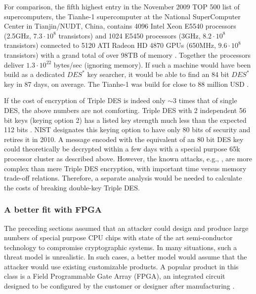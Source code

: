 \documentclass{article}
\begin{document}
\begin{comment}
84 bit
 120*84*2^(84-1)/(2.15*10^9*8.5*10^8*2^(16)*60*60*24)
96 bit
 120*96*2^(96-1)/(2.15*10^9*8.5*10^8*2^(16)*60*60*24*365)
\end{comment}

For comparison, the fifth highest entry in the November 2009 TOP 500 list of supercomputers,
the Tianhe-1 supercomputer at the National SuperComputer 
Center in Tianjin/NUDT, China, contains 4096 Intel Xeon E5540 processors (2.5GHz, 
$7.3\cdot 10^8$ transistors) and 1024 E5450 processors (3GHz, $8.2\cdot 10^8$ transistors) 
connected to 5120 ATI Radeon HD 4870 GPUs (650MHz, $9.6\cdot 10^8$ transistors)
with a grand total of over 98TB of memory \cite{StromGPU2009,Tianhe1,Valich2009}.
Together the processors deliver $1.3\cdot 10^{22}$ bytes/sec (ignoring memory). If such a machine 
would have been build as a dedicated $DES^*$  key searcher, it would be able to find an 
84 bit $DES^*$  key in 87 days, on average. The Tianhe-1 was build for close to
88 million USD \cite{Valich2009}.

\begin{comment}
Tianhe-1 84 bits
120*84*2^(84-1)/(1.3*10^(22)*60*60*24)
\end{comment}

If the cost of encryption of Triple DES is indeed only $\sim$3 times that of single DES, the above 
numbers are not comforting. Triple DES with 2 independent 56 bit keys (keying option 2) has a listed
key strength much less than the expected 112 bits \cite{lucks1998attacking,OorschotWiener90known}. 
NIST designates this keying option to have only 80 bits of security \cite{Polketal2006} and retires it
in 2010. A message  encoded with the equivalent of an 80 bit  DES key could theoretically be decrypted within a 
few days with a special purpose 65k processor cluster as described above. However, the known 
attacks, e.g., \cite{OorschotWiener90known,lucks1998attacking}, are more complex than mere 
Triple DES encryption, with important time versus memory trade-off relations. 
Therefore, a separate analysis would be needed to calculate the costs of breaking double-key Triple DES.

\subsubsection{A better fit with FPGA}\label{SectFPGA}

The preceding sections assumed that an attacker could design and produce large numbers
of special purpose CPU chips with state of the art semi-conductor technology to compromise 
cryptographic systems. In many situations, such a threat model is unrealistic. In such cases, 
a better model would assume that the attacker would use existing customizable products.
A popular product in this class is a Field Programmable Gate Array (FPGA), an integrated circuit designed to be configured by the customer or designer after manufacturing \cite{WikipediaFPGA}.
\end{document}
